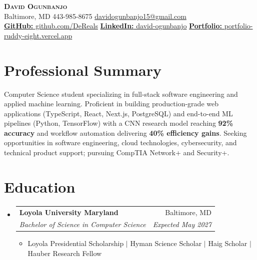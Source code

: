 \documentclass[letterpaper,10pt]{article}
\makeatletter
\newcommand{\resumeItem}[1]{
  \item\small{#1\vspace{-2pt}}
}
\newcommand{\resumeSubheading}[4]{
  \vspace{-1pt}\item
    \begin{tabular*}{0.99\textwidth}[t]{l@{\extracolsep{\fill}}r}
      \textbf{#1} & \small#2 \\
      \textit{\small#3} & \textit{\small#4} \\
    \end{tabular*}\vspace{-6pt}
}
\newcommand{\resumeSubHeadingListStart}{\begin{itemize}[leftmargin=0.1in, label={}]}
\newcommand{\resumeSubHeadingListEnd}{\end{itemize}}
\newcommand{\resumeItemListStart}{\begin{itemize}[leftmargin=0.2in]\vspace{-2pt}}
\newcommand{\resumeItemListEnd}{\end{itemize}\vspace{-4pt}}
\makeatother
\begin{document}
\begin{center}
    {\Huge \scshape \textbf{David Ogunbanjo}} \\ \vspace{3pt}
    \small
    Baltimore, MD \textbar{}
    443-985-8675 \textbar{}
    \href{mailto:davidogunbanjo15@gmail.com}{davidogunbanjo15@gmail.com} \\ \vspace{1pt}
    \href{https://github.com/DeReals}{\textbf{GitHub:} github.com/DeReals} \textbar{}
    \href{https://www.linkedin.com/in/david-ogunbanjo-987bb720b/}{\textbf{LinkedIn:} david-ogunbanjo} \textbar{}
    \href{https://portfolio-ruddy-eight-z8xw6ar77w.vercel.app/}{\textbf{Portfolio:} portfolio-ruddy-eight.vercel.app}
\end{center}
\vspace{-10pt}

\section{Professional Summary}
\small{
Computer Science student specializing in full-stack software engineering and applied machine learning. Proficient in building production-grade web applications (TypeScript, React, Next.js, PostgreSQL) and end-to-end ML pipelines (Python, TensorFlow) with a CNN research model reaching \textbf{92\% accuracy} and workflow automation delivering \textbf{40\% efficiency gains}. Seeking opportunities in software engineering, cloud technologies, cybersecurity, and technical product support; pursuing CompTIA Network+ and Security+.
}
\vspace{-4pt}

\section{Education}
  \resumeSubHeadingListStart
    \resumeSubheading
      {Loyola University Maryland}{Baltimore, MD}
      {Bachelor of Science in Computer Science}{Expected May 2027}
      \resumeItemListStart
        \resumeItem{Loyola Presidential Scholarship $|$ Hyman Science Scholar $|$ Haig Scholar $|$ Hauber Research Fellow}
      \resumeItemListEnd
  \resumeSubHeadingListEnd

\end{document}
